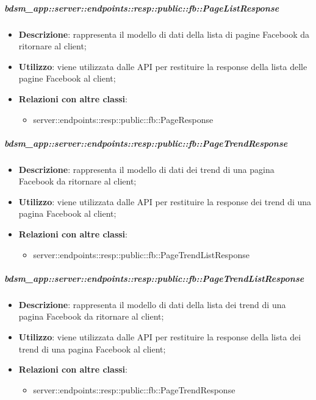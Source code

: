     \subparagraph{bdsm\_app::server::endpoints::resp::public::fb::PageListResponse} %
    \label{subp:bdsm_app_server_endpoints_resp_public_fb_pagelistresponse}
    \begin{itemize}
      \item \textbf{Descrizione}: rappresenta il modello di dati della lista di pagine Facebook da ritornare al client;
      \item \textbf{Utilizzo}: viene utilizzata dalle API per restituire la response della lista delle pagine Facebook al client;
      \item \textbf{Relazioni con altre classi}:
        \begin{itemize}
          \item server::endpoints::resp::public::fb::PageResponse
        \end{itemize}
      \end{itemize}
    
    \subparagraph{bdsm\_app::server::endpoints::resp::public::fb::PageTrendResponse} %
    \label{subp:bdsm_app_server_endpoints_resp_public_fb_pagetrendresponse}
    \begin{itemize}
      \item \textbf{Descrizione}: rappresenta il modello di dati dei trend di una pagina Facebook da ritornare al client;
      \item \textbf{Utilizzo}: viene utilizzata dalle API per restituire la response dei trend di una pagina Facebook al client;
      \item \textbf{Relazioni con altre classi}:
        \begin{itemize}
          \item server::endpoints::resp::public::fb::PageTrendListResponse
        \end{itemize}
      \end{itemize}
    
    \subparagraph{bdsm\_app::server::endpoints::resp::public::fb::PageTrendListResponse} %
    \label{subp:bdsm_app_server_endpoints_resp_public_fb_pagetrendlistresponse}
    \begin{itemize}
      \item \textbf{Descrizione}: rappresenta il modello di dati della lista dei trend di una pagina Facebook da ritornare al client;
      \item \textbf{Utilizzo}: viene utilizzata dalle API per restituire la response della lista dei trend di una pagina Facebook al client;
      \item \textbf{Relazioni con altre classi}:
        \begin{itemize}
          \item server::endpoints::resp::public::fb::PageTrendResponse
        \end{itemize}
      \end{itemize}
    
